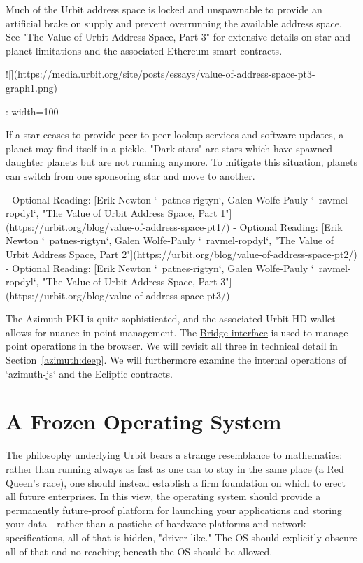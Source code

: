 {{{Much of the Urbit address space is locked and unspawnable to provide an artificial brake on supply and prevent overrunning the available address space.  See "The Value of Urbit Address Space, Part 3" for extensive details on star and planet limitations and the associated Ethereum smart contracts.

![](https://media.urbit.org/site/posts/essays/value-of-address-space-pt3-graph1.png){: width=100%

If a star ceases to provide peer-to-peer lookup services and software updates, a planet may find itself in a pickle.  "Dark stars" are stars which have spawned daughter planets but are not running anymore.  To mitigate this situation, planets can switch from one sponsoring star and move to another.

- Optional Reading: [Erik Newton `~patnes-rigtyn`, Galen Wolfe-Pauly `~ravmel-ropdyl`, "The Value of Urbit Address Space, Part 1"](https://urbit.org/blog/value-of-address-space-pt1/)
- Optional Reading: [Erik Newton `~patnes-rigtyn`, Galen Wolfe-Pauly `~ravmel-ropdyl`, "The Value of Urbit Address Space, Part 2"](https://urbit.org/blog/value-of-address-space-pt2/)
- Optional Reading: [Erik Newton `~patnes-rigtyn`, Galen Wolfe-Pauly `~ravmel-ropdyl`, "The Value of Urbit Address Space, Part 3"](https://urbit.org/blog/value-of-address-space-pt3/)

The Azimuth PKI is quite sophisticated, and the associated Urbit HD wallet allows for nuance in point management.  The \href{https://bridge.urbit.org/}{Bridge interface} is used to manage point operations in the browser.  We will revisit all three in technical detail in Section~\ref{azimuth:deep}.  We will furthermore examine the internal operations of `azimuth-js` and the Ecliptic contracts.


\section{A Frozen Operating System}

The philosophy underlying Urbit bears a strange resemblance to mathematics:  rather than running always as fast as one can to stay in the same place (a Red Queen's race), one should instead establish a firm foundation on which to erect all future enterprises.  In this view, the operating system should provide a permanently future-proof platform for launching your applications and storing your data—rather than a pastiche of hardware platforms and network specifications, all of that is hidden, "driver-like."  The OS should explicitly obscure all of that and no reaching beneath the OS should be allowed.

}}}}

